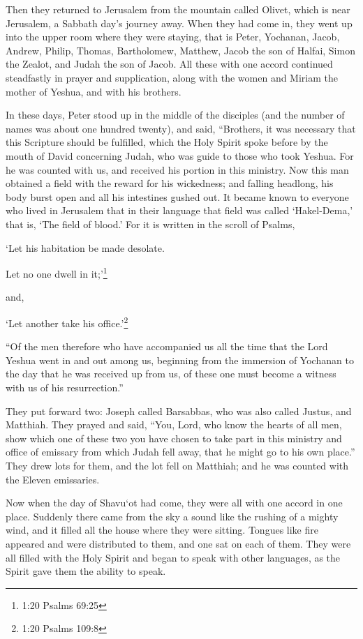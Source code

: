 \myverse{}Then they returned to Jerusalem from the mountain called Olivet,
which is near Jerusalem, a Sabbath day’s journey away.
\myverse{}When they had come in, they went up into the upper room where they were staying,
that is Peter, Yochanan, Jacob, Andrew, Philip, Thomas, Bartholomew, Matthew, Jacob the son of Halfai,
Simon the Zealot, and Judah the son of Jacob.
\myverse{}All these with one accord continued steadfastly in prayer and supplication,
along with the women and Miriam the mother of Yeshua, and with his brothers.

\myverse{}In these days, Peter stood up in the middle of the disciples
(and the number of names was about one hundred twenty), and said,
\myverse{}“Brothers, it was necessary that this Scripture should be fulfilled, which
the Holy Spirit spoke before by the mouth of David concerning Judah, who was guide to those who took Yeshua.
\myverse{}For he was counted with us, and received his portion in this ministry.
\myverse{}Now this man obtained a field with the reward for his wickedness; and falling
headlong, his body burst open and all his intestines gushed out.
\myverse{}It became known to everyone who lived in Jerusalem that in their language
that field was called ‘Hakel-Dema,’ that is, ‘The field of blood.’
\myverse{}For it is written in the scroll of Psalms,

‘Let his habitation be made desolate.

Let no one dwell in it;’\footnote{1:20 Psalms 69:25}

and,

‘Let another take his office.’\footnote{1:20 Psalms 109:8}

\myverse{}“Of the men therefore who have accompanied us all the time that
the Lord Yeshua went in and out among us,
\myverse{}beginning from the immersion of Yochanan to the day that he was received up
from us, of these one must become a witness with us of his resurrection.”

\myverse{}They put forward two: Joseph called Barsabbas, who was also called
Justus, and Matthiah.
\myverse{}They prayed and said, “You, Lord, who know the hearts of all men, show which
one of these two you have chosen
\myverse{}to take part in this ministry and office of emissary from which Judah fell
away, that he might go to his own place.”
\myverse{}They drew lots for them, and the lot fell on Matthiah; and he was counted
with the Eleven emissaries.


\mychapter{} \myverse*{}Now when the day of Shavu`ot had come, they were all with one accord
in one place.
\myverse{}Suddenly there came from the sky a sound like the rushing of a mighty wind,
and it filled all the house where they were sitting.
\myverse{}Tongues like fire appeared and were distributed to them, and one sat on each
of them.
\myverse{}They were all filled with the Holy Spirit and began to speak with other languages,
as the Spirit gave them the ability to speak.

